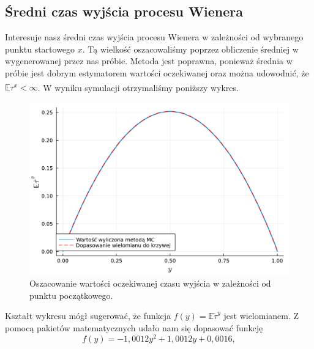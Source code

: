 \documentclass[12pt]{mwart}
\begin{document}
	
	\subsection{Średni czas wyjścia procesu Wienera}
	\noindent Interesuje nasz średni czas wyjścia procesu Wienera w zależności od wybranego punktu startowego $x$. Tą wielkość oszacowaliśmy poprzez obliczenie średniej w wygenerowanej przez nas próbie. Metoda jest poprawna, ponieważ średnia w próbie jest dobrym estymatorem wartości oczekiwanej oraz można udowodnić, że $\mathbb{E}\tau^x<\infty$\textsuperscript{\cite{art}}. W wyniku symulacji otrzymaliśmy poniższy wykres.
	\begin{figure}[H]
		\includegraphics[width=\columnwidth]{fig/plot/expect_val.pdf}
		\caption{Oszacowanie wartości oczekiwanej czasu wyjścia w zależności od punktu początkowego.}
	\end{figure}
	\noindent Kształt wykresu mógł sugerować, że funkcja $f(y)=\mathbb{E}\widetilde\tau^y$ jest wielomianem. Z pomocą pakietów matematycznych udało nam się dopasować funkcję 
	\begin{equation}\label{eq:oszac}
		f(y)=-1,0012y^2+1,0012y+0,0016,
	\end{equation}
\end{document}
